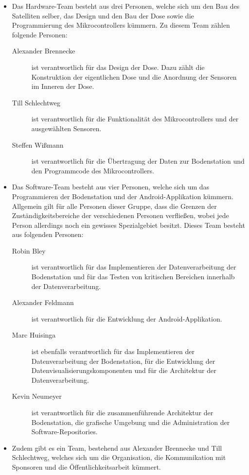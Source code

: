 \begin{itemize}
\item Das Hardware-Team besteht aus drei Personen, welche sich um den Bau des Satelliten selber, das Design und den Bau der Dose sowie die Programmierung des Mikrocontrollers kümmern. Zu diesem Team zählen folgende Personen:
\begin {description}
\item [Alexander Brennecke] ist verantwortlich für das Design der Dose. Dazu zählt die Konstruktion der eigentlichen Dose und die Anordnung der Sensoren im Inneren der Dose.

\item [Till Schlechtweg] ist verantwortlich für die Funktionalität des Mikrocontrollers und der ausgewählten Sensoren.

\item [Steffen Wißmann] ist verantwortlich für die Übertragung der Daten zur Bodenstation und den Programmcode des Mikrocontrollers.
\end {description}
\item Das Software-Team besteht aus vier Personen, welche sich um das Programmieren der Bodenstation und der Android-Applikation kümmern. Allgemein gilt für alle Personen dieser Gruppe, dass die Grenzen der Zuständigkeitsbereiche der verschiedenen Personen verfließen, wobei jede Person allerdings noch ein gewisses Spezialgebiet besitzt. Dieses Team besteht aus folgenden Personen:
\begin {description}
\item [Robin Bley] ist verantwortlich für das Implementieren der Datenverarbeitung der Bodenstation und für das Testen von kritischen Bereichen innerhalb der Datenverarbeitung.

\item [Alexander Feldmann] ist verantwortlich für die Entwicklung der Android-Applikation.

\item [Marc Huisinga] ist ebenfalls verantwortlich für das Implementieren der Datenverarbeitung der Bodenstation, für die Entwicklung der Datenvisualisierungskomponenten und für die Architektur der Datenverarbeitung.

\item [Kevin Neumeyer] ist verantwortlich für die zusammenführende Architektur der Bodenstation, die grafische Umgebung und die Administration der Software-Repositories.
\end {description}
\item Zudem gibt es ein Team, bestehend aus Alexander Brennecke und Till Schlechtweg, welches sich um die Organisation, die Kommunikation mit Sponsoren und die Öffentlichkeitsarbeit kümmert.


\end{itemize}
